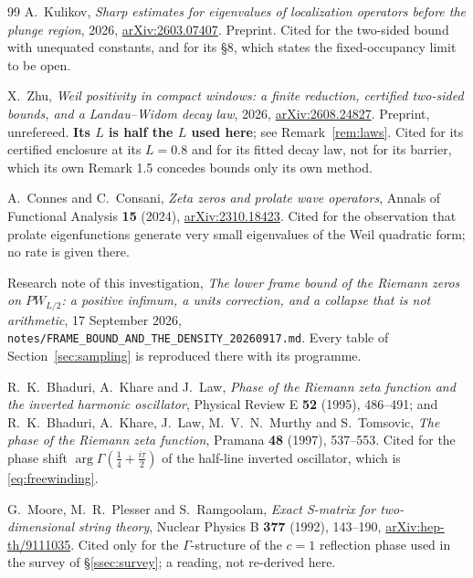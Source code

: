 \begin{thebibliography}{99}
A.~Kulikov, \emph{Sharp estimates for eigenvalues of localization operators
before the plunge region}, 2026,
\href{https://arxiv.org/abs/2603.07407}{arXiv:2603.07407}. Preprint. Cited for
the two-sided bound with unequated constants, and for its \S8, which states the
fixed-occupancy limit to be open.

X.~Zhu, \emph{Weil positivity in compact windows: a finite reduction, certified
two-sided bounds, and a Landau--Widom decay law}, 2026,
\href{https://arxiv.org/abs/2608.24827}{arXiv:2608.24827}. Preprint,
unrefereed. \textbf{Its $L$ is half the $L$ used here}; see
Remark~\ref{rem:laws}. Cited for its certified enclosure at its $L=0.8$ and for
its fitted decay law, not for its barrier, which its own Remark 1.5 concedes
bounds only its own method.

A.~Connes and C.~Consani, \emph{Zeta zeros and prolate wave operators}, Annals of
Functional Analysis \textbf{15} (2024),
\href{https://arxiv.org/abs/2310.18423}{arXiv:2310.18423}. Cited for the
observation that prolate eigenfunctions generate very small eigenvalues of the
Weil quadratic form; no rate is given there.

Research note of this investigation, \emph{The lower frame bound of the Riemann
zeros on $PW_{L/2}$: a positive infimum, a units correction, and a collapse that
is not arithmetic}, 17 September 2026,
\texttt{notes/FRAME\_BOUND\_AND\_THE\_DENSITY\_20260917.md}. Every table of
Section~\ref{sec:sampling} is reproduced there with its programme.

R.~K.~Bhaduri, A.~Khare and J.~Law, \emph{Phase of the Riemann zeta function and
the inverted harmonic oscillator}, Physical Review E \textbf{52} (1995),
486--491; and R.~K.~Bhaduri, A.~Khare, J.~Law, M.~V.~N.~Murthy and S.~Tomsovic,
\emph{The phase of the Riemann zeta function}, Pramana \textbf{48} (1997),
537--553. Cited for the phase shift $\arg\Gamma(\frac14+\frac{i\tau}2)$ of the
half-line inverted oscillator, which is \eqref{eq:freewinding}.

G.~Moore, M.~R.~Plesser and S.~Ramgoolam, \emph{Exact S-matrix for
two-dimensional string theory}, Nuclear Physics B \textbf{377} (1992), 143--190,
\href{https://arxiv.org/abs/hep-th/9111035}{arXiv:hep-th/9111035}. Cited only for
the $\Gamma$-structure of the $c=1$ reflection phase used in the survey of
\S\ref{ssec:survey}; a reading, not re-derived here.


\end{thebibliography}
